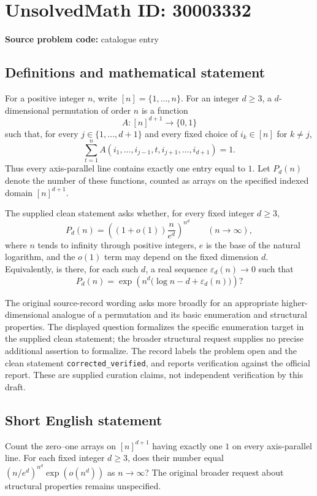 \documentclass[11pt]{article}
\begin{document}
\section*{UnsolvedMath ID: 30003332}
\textbf{Source problem code:} catalogue entry
\subsection{Definitions and mathematical statement}
For a positive integer \(n\), write \([n]=\{1,\ldots,n\}\). For an integer \(d\geq 3\), a \(d\)-dimensional permutation of order \(n\) is a function
\[
A:[n]^{d+1}\longrightarrow\{0,1\}
\]
such that, for every \(j\in\{1,\ldots,d+1\}\) and every fixed choice of \(i_k\in[n]\) for \(k\ne j\),
\[
\sum_{t=1}^{n}A(i_1,\ldots,i_{j-1},t,i_{j+1},\ldots,i_{d+1})=1.
\]
Thus every axis-parallel line contains exactly one entry equal to \(1\). Let \(P_d(n)\) denote the number of these functions, counted as arrays on the specified indexed domain \([n]^{d+1}\).

The supplied clean statement asks whether, for every fixed integer \(d\geq3\),
\[
P_d(n)=\left((1+o(1))\frac{n}{e^d}\right)^{n^d}
\qquad(n\to\infty),
\]
where \(n\) tends to infinity through positive integers, \(e\) is the base of the natural logarithm, and the \(o(1)\) term may depend on the fixed dimension \(d\). Equivalently, is there, for each such \(d\), a real sequence \(\varepsilon_d(n)\to0\) such that
\[
P_d(n)=\exp\!\left(n^d\bigl(\log n-d+\varepsilon_d(n)\bigr)\right)?
\]

The original source-record wording asks more broadly for an appropriate higher-dimensional analogue of a permutation and its basic enumeration and structural properties. The displayed question formalizes the specific enumeration target in the supplied clean statement; the broader structural request supplies no precise additional assertion to formalize. The record labels the problem open and the clean statement \texttt{corrected\_verified}, and reports verification against the official report. These are supplied curation claims, not independent verification by this draft.
\subsection{Short English statement}
Count the zero--one arrays on \([n]^{d+1}\) having exactly one \(1\) on every axis-parallel line. For each fixed integer \(d\geq3\), does their number equal \((n/e^d)^{n^d}\exp(o(n^d))\) as \(n\to\infty\)? The original broader request about structural properties remains unspecified.
\end{document}
